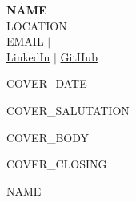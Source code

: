 \documentclass[11pt,a4paper]{article}
\begin{document}
\begin{flushleft}
    {\large\bfseries {{NAME}}} \\[2pt]
    {{LOCATION}} \\
    {{EMAIL}} \quad $\vert$  \\
    \href{{{LINKEDIN}}}{LinkedIn} \quad $\vert$ \quad \href{{{GITHUB}}}{GitHub}
\end{flushleft}

\vspace{10pt}

{{COVER_DATE}}

\vspace{10pt}

{{COVER_SALUTATION}}

{{COVER_BODY}}

{{COVER_CLOSING}}

\vspace{20pt}

{{NAME}}
\end{document}

